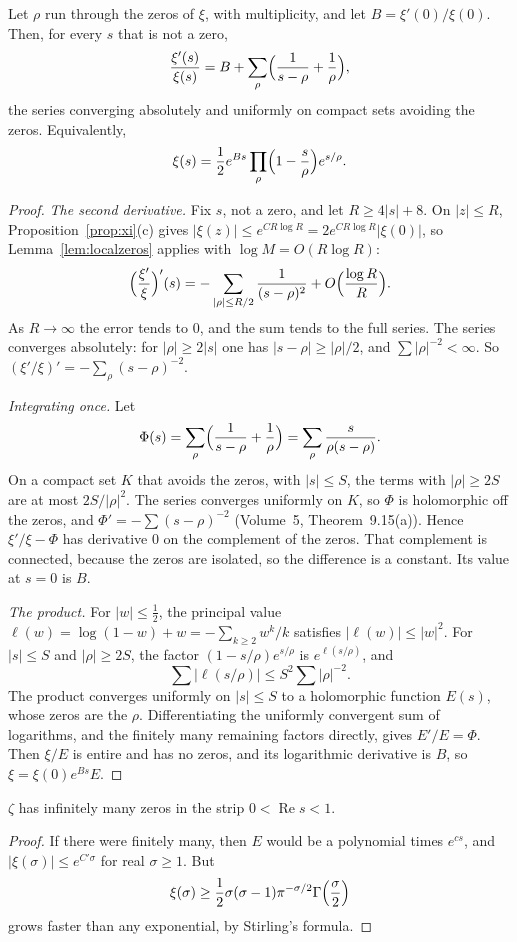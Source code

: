 \begin{theorem}[Hadamard, 1893]\label{thm:hadamard}
Let $\rho$ run through the zeros of $\xi$, with multiplicity, and let $B=\xi'(0)/\xi(0)$. Then, for every $s$ that is not a zero,
\[
\frac{\xi'(s)}{\xi(s)}=B+\sum_\rho\Bigl(\frac1{s-\rho}+\frac1\rho\Bigr),
\]
the series converging absolutely and uniformly on compact sets avoiding the zeros. Equivalently,
\[
\xi(s)=\frac12 e^{Bs}\prod_\rho\Bigl(1-\frac s\rho\Bigr)e^{s/\rho}.
\]
\end{theorem}
\begin{proof}
\emph{The second derivative.} Fix $s$, not a zero, and let $R\ge4|s|+8$. On $|z|\le R$, Proposition~\ref{prop:xi}(c) gives $|\xi(z)|\le e^{CR\log R}=2e^{CR\log R}|\xi(0)|$, so Lemma~\ref{lem:localzeros} applies with $\log M=O(R\log R)$:
\[
\Bigl(\frac{\xi'}{\xi}\Bigr)'(s)=-\sum_{|\rho|\le R/2}\frac1{(s-\rho)^2}+O\Bigl(\frac{\log R}R\Bigr).
\]
As $R\to\infty$ the error tends to $0$, and the sum tends to the full series. The series converges absolutely: for $|\rho|\ge2|s|$ one has $|s-\rho|\ge|\rho|/2$, and $\sum|\rho|^{-2}<\infty$. So $(\xi'/\xi)'=-\sum_\rho(s-\rho)^{-2}$.

\emph{Integrating once.} Let
\[
\Phi(s)=\sum_\rho\Bigl(\frac1{s-\rho}+\frac1\rho\Bigr)=\sum_\rho\frac s{\rho(s-\rho)}.
\]
On a compact set $K$ that avoids the zeros, with $|s|\le S$, the terms with $|\rho|\ge2S$ are at most $2S/|\rho|^2$. The series converges uniformly on $K$, so $\Phi$ is holomorphic off the zeros, and $\Phi'=-\sum(s-\rho)^{-2}$ (Volume~5, Theorem~9.15(a)). Hence $\xi'/\xi-\Phi$ has derivative $0$ on the complement of the zeros. That complement is connected, because the zeros are isolated, so the difference is a constant. Its value at $s=0$ is $B$.

\emph{The product.} For $|w|\le\frac12$, the principal value $\ell(w)=\log(1-w)+w=-\sum_{k\ge2}w^k/k$ satisfies $|\ell(w)|\le|w|^2$. For $|s|\le S$ and $|\rho|\ge2S$, the factor $(1-s/\rho)e^{s/\rho}$ is $e^{\ell(s/\rho)}$, and
\[
\sum|\ell(s/\rho)|\le S^2\sum|\rho|^{-2}.
\]
The product converges uniformly on $|s|\le S$ to a holomorphic function $E(s)$, whose zeros are the $\rho$. Differentiating the uniformly convergent sum of logarithms, and the finitely many remaining factors directly, gives $E'/E=\Phi$. Then $\xi/E$ is entire and has no zeros, and its logarithmic derivative is $B$, so $\xi=\xi(0)e^{Bs}E$.
\end{proof}

\begin{corollary}\label{cor:infinitezeros}
$\zeta$ has infinitely many zeros in the strip $0<\operatorname{Re}s<1$.
\end{corollary}
\begin{proof}
If there were finitely many, then $E$ would be a polynomial times $e^{cs}$, and $|\xi(\sigma)|\le e^{C'\sigma}$ for real $\sigma\ge1$. But
\[
\xi(\sigma)\ge\frac12\sigma(\sigma-1)\pi^{-\sigma/2}\Gamma\Bigl(\frac\sigma2\Bigr)
\]
grows faster than any exponential, by Stirling's formula.
\end{proof}

